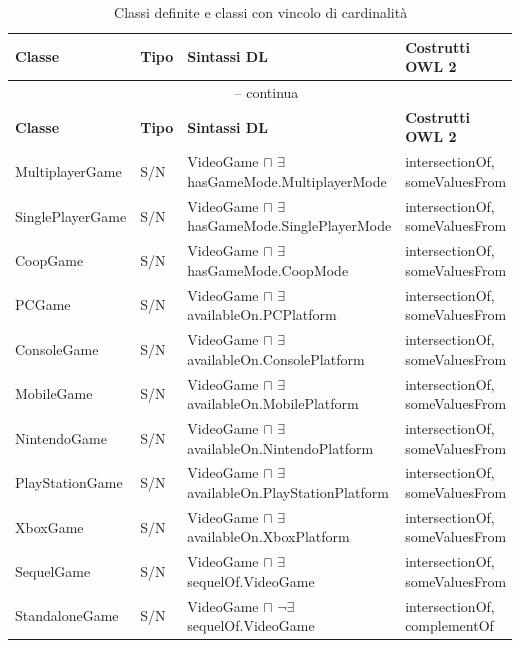 \begingroup\footnotesize\setlength{\tabcolsep}{2.5pt}
\begin{longtable}{ll>{\raggedright\arraybackslash}p{6.4cm}>{\raggedright\arraybackslash}p{3.4cm}}
\caption{Classi definite e classi con vincolo di cardinalit\`a}\label{tab:definite}\\
\toprule
\textbf{Classe} & \textbf{Tipo} & \textbf{Sintassi DL} & \textbf{Costrutti OWL 2} \\
\midrule
\endfirsthead
\multicolumn{4}{c}{\tablename\ \thetable{} -- continua} \\
\toprule
\textbf{Classe} & \textbf{Tipo} & \textbf{Sintassi DL} & \textbf{Costrutti OWL 2} \\
\midrule
\endhead
\bottomrule
\endlastfoot

MultiplayerGame     & S/N & VideoGame $\sqcap$ $\exists$hasGameMode.MultiplayerMode   & intersectionOf, someValuesFrom \\
SinglePlayerGame    & S/N & VideoGame $\sqcap$ $\exists$hasGameMode.SinglePlayerMode  & intersectionOf, someValuesFrom \\
CoopGame            & S/N & VideoGame $\sqcap$ $\exists$hasGameMode.CoopMode           & intersectionOf, someValuesFrom \\
PCGame              & S/N & VideoGame $\sqcap$ $\exists$availableOn.PCPlatform         & intersectionOf, someValuesFrom \\
ConsoleGame         & S/N & VideoGame $\sqcap$ $\exists$availableOn.ConsolePlatform    & intersectionOf, someValuesFrom \\
MobileGame          & S/N & VideoGame $\sqcap$ $\exists$availableOn.MobilePlatform     & intersectionOf, someValuesFrom \\
NintendoGame        & S/N & VideoGame $\sqcap$ $\exists$availableOn.NintendoPlatform   & intersectionOf, someValuesFrom \\
PlayStationGame     & S/N & VideoGame $\sqcap$ $\exists$availableOn.PlayStationPlatform& intersectionOf, someValuesFrom \\
XboxGame            & S/N & VideoGame $\sqcap$ $\exists$availableOn.XboxPlatform       & intersectionOf, someValuesFrom \\
SequelGame          & S/N & VideoGame $\sqcap$ $\exists$sequelOf.VideoGame             & intersectionOf, someValuesFrom \\
StandaloneGame      & S/N & VideoGame $\sqcap$ $\neg\exists$sequelOf.VideoGame          & intersectionOf, complementOf \\

\end{longtable}
